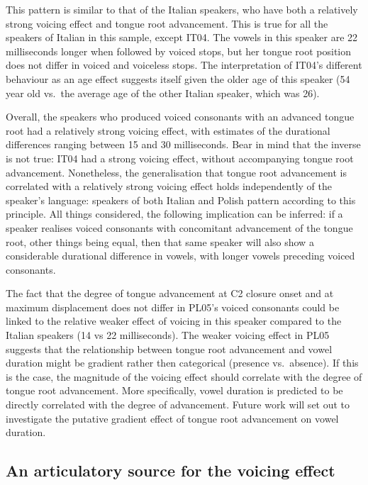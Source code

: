\documentclass[authoryear, twocolumn]{elsarticle}
\begin{document}
This pattern is similar to that of the Italian speakers, who have both a
relatively strong voicing effect and tongue root advancement. This is
true for all the speakers of Italian in this sample, except IT04. The
vowels in this speaker are 22 milliseconds longer when followed by
voiced stops, but her tongue root position does not differ in voiced and
voiceless stops. The interpretation of IT04's different behaviour as an
age effect suggests itself given the older age of this speaker (54 year
old vs.~the average age of the other Italian speaker, which was 26).

Overall, the speakers who produced voiced consonants with an advanced
tongue root had a relatively strong voicing effect, with estimates of
the durational differences ranging between 15 and 30 milliseconds. Bear
in mind that the inverse is not true: IT04 had a strong voicing effect,
without accompanying tongue root advancement. Nonetheless, the
generalisation that tongue root advancement is correlated with a
relatively strong voicing effect holds independently of the speaker's
language: speakers of both Italian and Polish pattern according to this
principle. All things considered, the following implication can be
inferred: if a speaker realises voiced consonants with concomitant
advancement of the tongue root, other things being equal, then that same
speaker will also show a considerable durational difference in vowels,
with longer vowels preceding voiced consonants.

The fact that the degree of tongue advancement at C2 closure onset and
at maximum displacement does not differ in PL05's voiced consonants
could be linked to the relative weaker effect of voicing in this speaker
compared to the Italian speakers (14 vs 22 milliseconds). The weaker
voicing effect in PL05 suggests that the relationship between tongue
root advancement and vowel duration might be gradient rather then
categorical (presence vs.~absence). If this is the case, the magnitude
of the voicing effect should correlate with the degree of tongue root
advancement. More specifically, vowel duration is predicted to be
directly correlated with the degree of advancement. Future work will set
out to investigate the putative gradient effect of tongue root
advancement on vowel duration.

\subsection{An articulatory source for the voicing
effect}\label{an-articulatory-source-for-the-voicing-effect}
\end{document}
